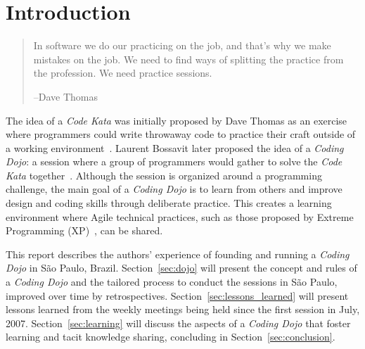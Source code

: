 \section{Introduction}\label{sec:introduction}

\begin{quote}
In software we do our practicing on the job, and that’s why we make mistakes on the job.
We need to find ways of splitting the practice from the profession. We need practice sessions.

--Dave Thomas
\end{quote}

The idea of a \emph{Code Kata} was initially proposed by Dave Thomas as an exercise where programmers
could write throwaway code to practice their craft outside of a working environment~\cite{DaveThomas}.
Laurent Bossavit later proposed the idea of a \emph{Coding Dojo}: a session where a group of programmers
would gather to solve the \emph{Code Kata} together~\cite{Bossavit}. Although the session is organized
around a programming challenge, the main goal of a \emph{Coding Dojo} is to learn from others and
improve design and coding skills through deliberate practice. This creates a learning environment where
Agile technical practices, such as those proposed by Extreme Programming (XP)~\cite{XP2E}, can be shared.

This report describes the authors' experience of founding and running a \emph{Coding Dojo} in
São Paulo, Brazil. Section~\ref{sec:dojo} will present the concept and rules of a \emph{Coding Dojo} and
the tailored process to conduct the sessions in São Paulo, improved over time by retrospectives.
Section~\ref{sec:lessons_learned} will present lessons learned from the weekly meetings being held since
the first session in July, 2007. Section~\ref{sec:learning} will discuss the aspects of a \emph{Coding Dojo}
that foster learning and tacit knowledge sharing, concluding in Section~\ref{sec:conclusion}.